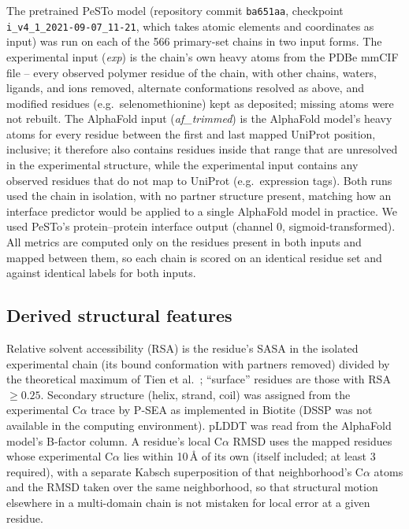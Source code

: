 \documentclass[10pt]{article}
\begin{document}
The pretrained PeSTo model (repository commit \texttt{ba651aa}, checkpoint
\texttt{i\_v4\_1\_2021-09-07\_11-21}, which takes atomic elements and coordinates as input)
was run on each of the 566 primary-set chains in two input forms.
The experimental input (\emph{exp}) is the chain's own heavy atoms from the
PDBe mmCIF file -- every observed polymer residue of the chain, with other
chains, waters, ligands, and ions removed, alternate conformations resolved
as above, and modified residues (e.g.\ selenomethionine) kept as deposited;
missing atoms were not rebuilt. The AlphaFold input (\emph{af\_trimmed}) is
the AlphaFold model's heavy atoms for every residue between the first and
last mapped UniProt position, inclusive; it therefore also contains residues
inside that range that are unresolved in the experimental structure, while
the experimental input contains any observed residues that do not map to
UniProt (e.g.\ expression tags). Both runs used the chain in isolation, with
no partner structure present, matching how an interface predictor would be
applied to a single AlphaFold model in practice. We used PeSTo's
protein--protein interface output (channel 0, sigmoid-transformed). All
metrics are computed only on the residues present in both inputs and mapped
between them, so each chain is scored on an identical residue set and against
identical labels for both inputs.

\subsection{Derived structural features}
\label{sec:features}

Relative solvent accessibility (RSA) is the residue's SASA in the isolated
experimental chain (its bound conformation with partners removed) divided by
the theoretical maximum of Tien et al.\ \cite{tien2013}; ``surface'' residues
are those with RSA $\geq 0.25$. Secondary structure
(helix, strand, coil) was assigned from the experimental C$\alpha$ trace by
P-SEA \cite{labesse1997} as implemented in Biotite (DSSP was not available
in the computing environment). pLDDT was read from the AlphaFold model's
B-factor column. A residue's local C$\alpha$ RMSD uses the mapped residues
whose experimental C$\alpha$ lies within 10\,\r{A} of its
own (itself included; at least 3 required), with a
separate Kabsch superposition of that neighborhood's C$\alpha$ atoms and the
RMSD taken over the same neighborhood, so that structural motion elsewhere in
a multi-domain chain is not mistaken for local error at a given residue.
\end{document}
